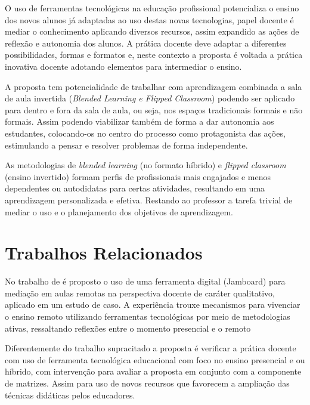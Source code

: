O uso de ferramentas tecnológicas na educação profissional potencializa o ensino dos novos alunos já adaptadas ao uso destas novas tecnologias, papel docente é mediar o conhecimento aplicando diversos recursos, assim expandido as ações de reflexão e autonomia dos alunos. A prática docente deve adaptar a diferentes possibilidades, formas e formatos e, neste contexto a proposta é voltada a prática inovativa docente adotando elementos para intermediar o ensino.

A proposta tem potencialidade de trabalhar com aprendizagem combinada a sala de aula invertida (\textit{Blended Learning e Flipped Classroom}) podendo ser aplicado para dentro e fora da sala de aula, ou seja, nos espaços tradicionais formais e não formais. Assim podendo viabilizar também de forma a dar autonomia aos estudantes, colocando-os no centro do processo como protagonista das ações, estimulando a pensar e resolver problemas de forma independente.

As metodologias de \textit{blended learning} (no formato híbrido) e \textit{flipped classroom} (ensino invertido) formam perfis de profissionais mais engajados e menos dependentes ou autodidatas para certas atividades, resultando em uma aprendizagem personalizada e efetiva. Restando ao professor a tarefa trivial de mediar o uso e o planejamento dos objetivos de aprendizagem.




















\section{Trabalhos Relacionados}
\label{trabalhos_relacionados}

No trabalho de  é proposto o uso de uma ferramenta digital (Jamboard) para mediação em aulas remotas na perspectiva docente de caráter qualitativo, aplicado em um estudo de caso. A experiência trouxe mecanismos para vivenciar o ensino remoto utilizando ferramentas tecnológicas por meio de metodologias ativas, ressaltando reflexões entre o momento presencial e o remoto \cite{florencio2021perspectivas}

Diferentemente do trabalho supracitado a proposta é verificar a prática docente com uso de ferramenta tecnológica educacional com foco no ensino presencial e ou híbrido, com intervenção para avaliar a proposta em conjunto com a componente de matrizes. Assim para uso de novos recursos que favorecem   a   ampliação   das   técnicas   didáticas   pelos   educadores.

